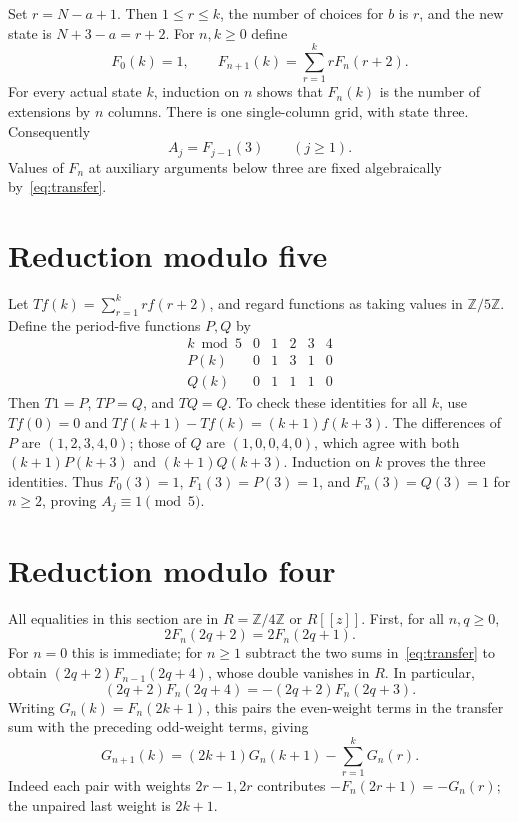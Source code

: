 \documentclass[11pt]{article}
\newcommand{\Z}{\mathbb Z}
\begin{document}
Set $r=N-a+1$. Then $1\leq r\leq k$, the number of choices for $b$
is $r$, and the new state is $N+3-a=r+2$.
For $n,k\geq0$ define
\begin{equation}\label{eq:transfer}
 F_0(k)=1,\qquad F_{n+1}(k)=\sum_{r=1}^{k}rF_n(r+2).
\end{equation}
For every actual state $k$, induction on $n$ shows that $F_n(k)$ is
the number of extensions by $n$ columns. There is one single-column
grid, with state three. Consequently
\begin{equation}\label{eq:A}
 A_j=F_{j-1}(3)\qquad(j\geq1).
\end{equation}
Values of $F_n$ at auxiliary arguments below three are fixed
algebraically by~\eqref{eq:transfer}.

\section{Reduction modulo five}
Let $Tf(k)=\sum_{r=1}^k rf(r+2)$, and regard functions as taking values
in $\Z/5\Z$. Define the period-five functions $P,Q$ by
\[
\begin{array}{c|rrrrr}
 k\bmod5&0&1&2&3&4\\\hline
 P(k)&0&1&3&1&0\\
 Q(k)&0&1&1&1&0
\end{array}
\]
Then $T1=P$, $TP=Q$, and $TQ=Q$. To check these identities for all
$k$, use $Tf(0)=0$ and
$Tf(k+1)-Tf(k)=(k+1)f(k+3)$.
The differences of $P$ are $(1,2,3,4,0)$; those of $Q$ are
$(1,0,0,4,0)$, which agree with both $(k+1)P(k+3)$ and
$(k+1)Q(k+3)$. Induction on $k$ proves the three identities.
Thus $F_0(3)=1$, $F_1(3)=P(3)=1$, and $F_n(3)=Q(3)=1$ for $n\geq2$,
proving $A_j\equiv1\pmod5$.

\section{Reduction modulo four}
All equalities in this section are in $R=\Z/4\Z$ or $R[[z]]$.
First, for all $n,q\geq0$,
\begin{equation}\label{eq:neighbor}
 2F_n(2q+2)=2F_n(2q+1).
\end{equation}
For $n=0$ this is immediate; for $n\geq1$ subtract the two sums
in~\eqref{eq:transfer} to obtain
$(2q+2)F_{n-1}(2q+4)$, whose double vanishes in $R$.
In particular,
\[
 (2q+2)F_n(2q+4)=-(2q+2)F_n(2q+3).
\]
Writing $G_n(k)=F_n(2k+1)$, this pairs the even-weight terms in the
transfer sum with the preceding odd-weight terms, giving
\begin{equation}\label{eq:odd}
 G_{n+1}(k)=(2k+1)G_n(k+1)-\sum_{r=1}^kG_n(r).
\end{equation}
Indeed each pair with weights $2r-1,2r$ contributes
$-F_n(2r+1)=-G_n(r)$; the unpaired last weight is $2k+1$.
\end{document}
